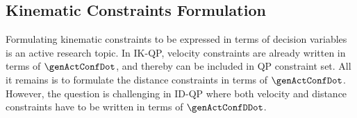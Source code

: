 %
\subsection{Kinematic Constraints Formulation}\label{subsec-chap0:kinematic constraints formulation}
Formulating kinematic constraints to be expressed in terms of decision variables is an active research topic. 
In IK-QP, velocity constraints are already written in terms of $\genActConfDot$, and thereby can be included in QP constraint set. All it remains is to formulate the distance constraints in terms of $\genActConfDot$. 
However, the question is challenging in ID-QP where both velocity and distance constraints have to be written in terms of $\genActConfDDot$.  %

